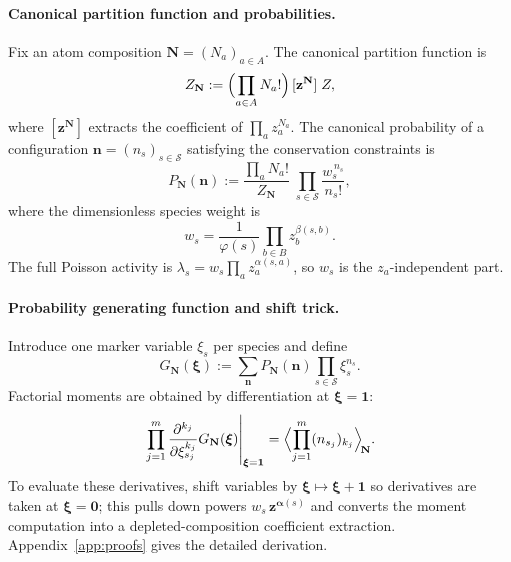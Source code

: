 \documentclass[11pt]{amsart}
\newcommand{\Species}{\mathcal{S}}
\newcommand{\GFensemble}{Z}
\theoremstyle{definition}
\theoremstyle{plain}
\theoremstyle{remark}
\begin{document}
\paragraph{Canonical partition function and probabilities.}
Fix an atom composition $\mathbf{N}=(N_a)_{a\in A}$.
The canonical partition function is
\begin{equation}\label{eq:canonical_partition_general}
\GFensemble_{\mathbf{N}}
:= \Bigl(\prod_{a\in A} N_a!\Bigr)\,[\mathbf{z}^{\mathbf{N}}]\;\GFensemble,
\end{equation}
where $[\mathbf{z}^{\mathbf{N}}]$ extracts the coefficient of $\prod_a z_a^{N_a}$.
The canonical probability of a configuration $\mathbf{n}=(n_s)_{s\in\Species}$ satisfying the conservation constraints is
\begin{equation}\label{eq:canonical_probability_general}
P_{\mathbf{N}}(\mathbf{n})
:= \frac{\prod_a N_a!}{\GFensemble_{\mathbf{N}}}
\;\prod_{s\in\Species}\frac{w_s^{\,n_s}}{n_s!},
\end{equation}
where the dimensionless species weight is
\begin{equation}\label{eq:species_weight_def}
w_s = \frac{1}{\varphi(s)}\prod_{b\in B} z_b^{\beta(s,b)}.
\end{equation}
The full Poisson activity is $\lambda_s = w_s\prod_a z_a^{\alpha(s,a)}$, so $w_s$ is the $z_a$-independent part.

\paragraph{Probability generating function and shift trick.}
Introduce one marker variable $\xi_s$ per species and define
\begin{equation}\label{eq:canonical_pgf}
G_{\mathbf{N}}(\boldsymbol{\xi})
:=\sum_{\mathbf{n}}P_{\mathbf{N}}(\mathbf{n})\prod_{s\in\Species}\xi_s^{n_s}.
\end{equation}
Factorial moments are obtained by differentiation at $\boldsymbol{\xi}=\mathbf{1}$:
\[
\left.\prod_{j=1}^{m}\frac{\partial^{k_j}}{\partial \xi_{s_j}^{k_j}}
G_{\mathbf{N}}(\boldsymbol{\xi})\right|_{\boldsymbol{\xi}=\mathbf{1}}
=
\Bigl\langle \prod_{j=1}^{m}(n_{s_j})_{k_j}\Bigr\rangle_{\!\mathbf{N}}.
\]
To evaluate these derivatives, shift variables by $\boldsymbol{\xi}\mapsto\boldsymbol{\xi}+\mathbf{1}$ so derivatives are taken at $\boldsymbol{\xi}=\mathbf{0}$; this pulls down powers $w_s\,\mathbf{z}^{\boldsymbol{\alpha}(s)}$ and converts the moment computation into a depleted-composition coefficient extraction. Appendix~\ref{app:proofs} gives the detailed derivation.
\end{document}
